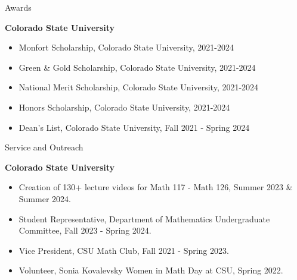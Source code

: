 \documentclass[
	11pt, %
]{resume} %
\begin{document}

\begin{rSection}{Awards} %


	\textbf{Colorado State University}
	\begin{itemize}
		\item{Monfort Scholarship, Colorado State University, 2021-2024}
		\item{Green \& Gold Scholarship, Colorado State University, 2021-2024}
		\item{National Merit Scholarship, Colorado State University, 2021-2024}
		\item{Honors Scholarship, Colorado State University, 2021-2024}
		\item{Dean's List, Colorado State University, Fall 2021 - Spring 2024}\\
	\end{itemize}
	
\end{rSection}


\begin{rSection}{Service and Outreach}

	\textbf{Colorado State University}
	\begin{itemize}
		\item{Creation of 130+ lecture videos for Math 117 - Math 126, Summer 2023 \& Summer 2024.}
		\item{Student Representative, Department of Mathematics Undergraduate Committee, Fall 2023 - Spring 2024.}
		\item{Vice President, CSU Math Club, Fall 2021 - Spring 2023.}
		\item{Volunteer, Sonia Kovalevsky Women in Math Day at CSU, Spring 2022.}\\
	\end{itemize}
	
\end{rSection}
\end{document}
